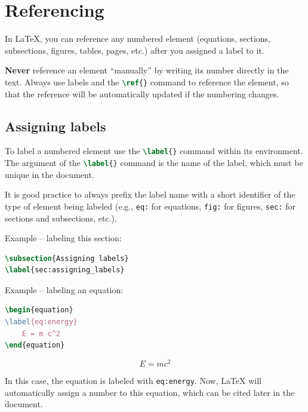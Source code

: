 \chapter{Referencing}

In \LaTeX{}, you can reference any numbered element (equations, sections, subsections, figures, tables, pages, etc.) after you assigned a label to it.

\textbf{Never} reference an element ``manually'' by writing its number directly in the text. Always use labels and the \lstinline[language=TeX]|\ref{}| command to reference the element, so that the reference will be automatically updated if the numbering changes.

\section{Assigning labels}
\label{sec:assigning_labels}

To label a numbered element use the \lstinline[language=TeX]|\label{}| command within its environment.
The argument of the \lstinline[language=TeX]|\label{}| command is the name of the label, which must be unique in the document.

It is good practice to always prefix the label name with a short identifier of the type of element being labeled (e.g., \lstinline[language=TeX]|eq:| for equations, \lstinline[language=TeX]|fig:| for figures, \lstinline[language=TeX]|sec:| for sections and subsections, etc.).

Example -- labeling this section:
\begin{lstlisting}[language=TeX]
\subsection{Assigning labels}
\label{sec:assigning_labels}
\end{lstlisting}

Example -- labeling an equation:
\begin{lstlisting}[language=TeX]
\begin{equation}
\label{eq:energy}
    E = m c^2
\end{equation}
\end{lstlisting}
\begin{equation}
\label{eq:energy}
    E = m c^2
\end{equation}

In this case, the equation is labeled with \lstinline[language=TeX]|eq:energy|. Now, \LaTeX{} will automatically assign a number to this equation, which can be cited later in the document.

